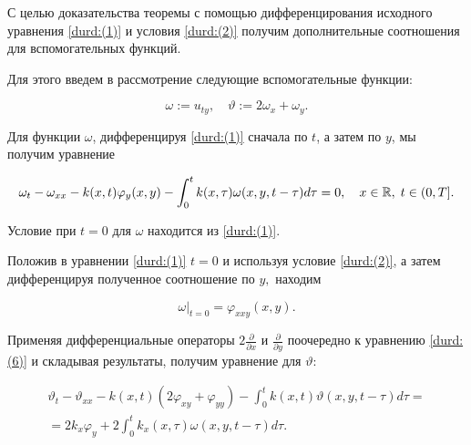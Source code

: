 С целью доказательства теоремы с помощью дифференцирования исходного  уравнения \eqref{durd:(1)} и условия \eqref{durd:(2)} получим дополнительные соотношения для вспомогательных функций. 

Для этого введем в рассмотрение следующие вспомогательные функции:

$$

\omega:=u_{ty},\quad  \vartheta:=2\omega_{x}+\omega_{y}.  

$$



Для функции $\omega$, дифференцируя \eqref{durd:(1)}  сначала по $t$, а затем по $y$, мы получим уравнение

\begin{equation}

\label{durd:(6)}

\omega_{t}-\omega_{xx}-k(x,t)\varphi_{y}(x,y)-\int^{t}_{0}k(x,\tau)\omega(x,y,t-\tau)d\tau=0, \quad  x\in{{\Bbb R}}, \; t\in(0, T]. 

\end{equation}



Условие при $t=0$ для $\omega$ находится из \eqref{durd:(1)}. 

Положив в уравнении \eqref{durd:(1)}  $t=0$ и используя условие \eqref{durd:(2)}, а затем дифференцируя полученное соотношение по $y,$  находим  

\begin{equation}

\label{durd:(7)}

\omega\big|_{t=0}=\varphi_{xxy}(x,y). 

\end{equation}



Применяя дифференциальные  операторы  $2\frac{\partial}{\partial{x}}$ и $\frac{\partial}{\partial{y}}$ поочередно к уравнению \eqref{durd:(6)} и складывая результаты, получим уравнение для $\vartheta$:

\begin{multline}

\label{durd:(8)}

\vartheta_{t}-\vartheta_{xx}-k(x,t)(2\varphi_{xy}+\varphi_{yy})-\int^{t}_{0}k(x,t)\vartheta(x,y,t-\tau)d\tau=

\\

=2k_{x}\varphi_{y}+2\int^{t}_{0}k_{x}(x,\tau)\omega(x,y,t-\tau)d\tau.

\end{multline}

